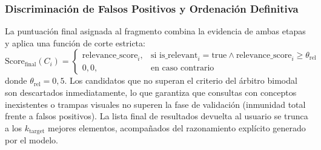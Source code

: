 \subsubsection{Discriminación de Falsos Positivos y Ordenación Definitiva}
La puntuación final asignada al fragmento combina la evidencia de ambas etapas y aplica una función de corte estricta:
\begin{equation}
    \text{Score}_{\text{final}}(C_i) = \begin{cases}
        \text{relevance\_score}_i, & \text{si } \text{is\_relevant}_i = \text{true} \land \text{relevance\_score}_i \ge \theta_{\text{rel}} \\
        0,0, & \text{en caso contrario}
    \end{cases}
\end{equation}
donde $\theta_{\text{rel}} = 0,5$. Los candidatos que no superan el criterio del árbitro bimodal son descartados inmediatamente, lo que garantiza que consultas con conceptos inexistentes o trampas visuales no superen la fase de validación (inmunidad total frente a falsos positivos). La lista final de resultados devuelta al usuario se trunca a los $k_{\text{target}}$ mejores elementos, acompañados del razonamiento explícito generado por el modelo.
